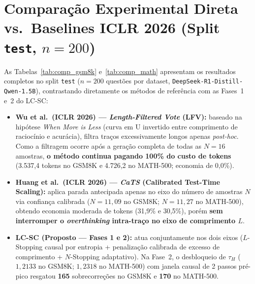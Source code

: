 \documentclass[11pt,a4paper]{article}
\begin{document}
\section{Comparação Experimental Direta vs.\ Baselines ICLR 2026 (Split \texttt{test}, $n=200$)}

As Tabelas~\ref{tab:comp_gsm8k} e~\ref{tab:comp_math} apresentam os resultados completos no split \texttt{test} ($n=200$ questões por dataset, \texttt{DeepSeek-R1-Distill-Qwen-1.5B}), contrastando diretamente os métodos de referência com as Fases~1 e~2 do LC-SC:

\begin{itemize}[leftmargin=1.4em,itemsep=2pt]
  \item \textbf{Wu et al.\ (ICLR 2026) --- \emph{Length-Filtered Vote} (LFV):} baseado na hipótese \emph{When More is Less} (curva em U invertido entre comprimento de raciocínio e acurácia), filtra traços excessivamente longos apenas \emph{post-hoc}. Como a filtragem ocorre após a geração completa de todas as $N=16$ amostras, \textbf{o método continua pagando 100\% do custo de tokens} (3.537,4 tokens no GSM8K e 4.726,2 no MATH-500; economia de 0,0\%).
  \item \textbf{Huang et al.\ (ICLR 2026) --- \emph{CaTS} (Calibrated Test-Time Scaling):} aplica parada antecipada apenas no eixo do número de amostras $N$ via confiança calibrada ($N=11{,}09$ no GSM8K; $N=11{,}27$ no MATH-500), obtendo economia moderada de tokens (31,9\% e 30,5\%), porém \textbf{sem interromper o \emph{overthinking} intra-traço no eixo de comprimento $L$}.
  \item \textbf{LC-SC (Proposto --- Fases 1 e 2):} atua conjuntamente nos dois eixos ($L$-Stopping causal por entropia + penalização calibrada de excesso de comprimento + $N$-Stopping adaptativo). Na Fase~2, o desbloqueio de $\tau_H$ ($1{,}2133$ no GSM8K; $1{,}2318$ no MATH-500) com janela causal de 2 passos pré-pico resgatou \textbf{165} sobrecorreções no GSM8K e \textbf{170} no MATH-500.
\end{itemize}
\end{document}

